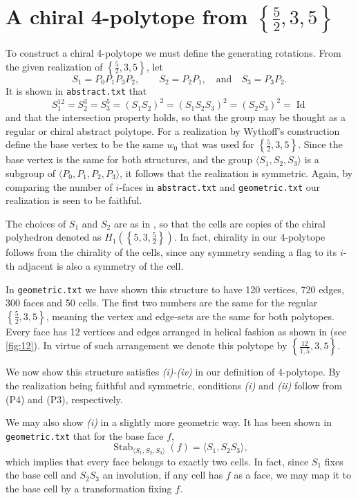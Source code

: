 \documentclass{article}
\theoremstyle{definition}
\DeclareMathOperator{\Id}{Id}
\DeclareMathOperator{\Stab}{Stab}
\begin{document}
	\section{A chiral 4-polytope from $\left\{\frac{5}{2},3,5\right\}$}
	To construct a chiral 4-polytope we must define the generating rotations. From the given realization of $\left\{\frac{5}{2},3,5\right\}$, let
		\[S_1=P_0P_1P_3P_2,\qquad S_2=P_2P_1,\quad\text{and}\quad S_3=P_3P_2.\]
	It is shown in \texttt{abstract.txt} that
		\[S_1^{12}=S_2^3=S_3^5=(S_1S_2)^2=(S_1S_2S_3)^2=(S_2S_3)^2=\Id\]
	and that the intersection property holds, so that the group may be thought as a regular or chiral abstract polytope. For a realization by Wythoff's construction define the base vertex to be the same $w_0$ that was used for $\left\{\frac{5}{2},3,5\right\}$. Since the base vertex is the same for both structures, and the group $\langle S_1,S_2,S_3\rangle$ is a subgroup of $\langle P_0,P_1,P_2,P_3\rangle$, it follows that the realization is symmetric. Again, by comparing the number of $i$-faces in \texttt{abstract.txt} and \texttt{geometric.txt} our realization is seen to be faithful.
	
	The choices of $S_1$ and $S_2$ are as in  \cite{petcox}, so that the cells are copies of the chiral polyhedron denoted as $H_1(\left\{5,3,\frac{5}{2}\right\})$. In fact, chirality in our 4-polytope follows from the chirality of the cells, since any symmetry sending a flag to its $i$-th adjacent is also a symmetry of the cell.
	
	In \texttt{geometric.txt} we have shown this structure to have 120 vertices, 720 edges, 300 faces and 50 cells. The first two numbers are the same for the regular $\left\{\frac{5}{2},3,5\right\}$, meaning the vertex and edge-sets are the same for both polytopes. Every face has 12 vertices and edges arranged in helical fashion as shown in \cite{petcox} (see \cref{fig:12}). In virtue of such arrangement we denote this polytope by $\left\{\frac{12}{1,5},3,5\right\}$.
	
	
	We now show this structure satisfies \textit{(i)-(iv)} in our definition of 4-polytope. By the realization being faithful and symmetric, conditions \textit{(i)} and \textit{(ii)} follow from (P4) and (P3), respectively.
	
	We may also show \textit{(i)} in a slightly more geometric way. It has been shown in  \texttt{geometric.txt} that for the base face $f$,
	\begin{equation*}\label{ec:stab-face}
		\Stab_{\langle S_1,S_2,S_3\rangle}(f)=\langle S_1,S_2S_3\rangle,
	\end{equation*}
	which implies that every face belongs to exactly two cells. In fact, since $S_1$ fixes the base cell and $S_2S_3$ an involution, if any cell has $f$ as a face, we may map it to the base cell by a transformation fixing $f$.
	
\end{document}
